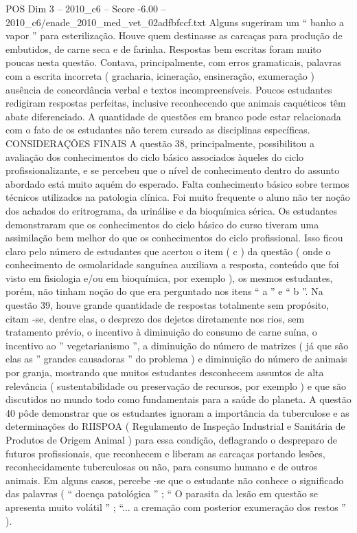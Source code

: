 \begin{textsample}{POS Dim 3 – 2010\_c6 – Score -6.00 – 2010\_c6/enade\_2010\_med\_vet\_02adfbfccf.txt}
Alguns sugeriram um “ banho a vapor ” para esterilização.
Houve quem destinasse as carcaças para produção de embutidos, de carne seca e de farinha.
Respostas bem escritas foram muito poucas nesta questão.
Contava, principalmente, com erros gramaticais, palavras com a escrita incorreta ( gracharia, icineração, ensineração, exumeração ) ausência de concordância verbal e textos incompreensíveis.
Poucos estudantes redigiram respostas perfeitas, inclusive reconhecendo que animais caquéticos têm abate diferenciado.
A quantidade de questões em branco pode estar relacionada com o fato de os estudantes não terem cursado as disciplinas específicas.
CONSIDERAÇÕES FINAIS A questão 38, principalmente, possibilitou a avaliação dos conhecimentos do ciclo básico associados àqueles do ciclo profissionalizante, e se percebeu que o nível de conhecimento dentro do assunto abordado está muito aquém do esperado.
Falta conhecimento básico sobre termos técnicos utilizados na patologia clínica.
Foi muito frequente o aluno não ter noção dos achados do eritrograma, da urinálise e da bioquímica sérica.
Os estudantes demonstraram que os conhecimentos do ciclo básico do curso tiveram uma assimilação bem melhor do que os conhecimentos do ciclo profissional.
Isso ficou claro pelo número de estudantes que acertou o item ( c ) da questão ( onde o conhecimento de osmolaridade sanguínea auxiliava a resposta, conteúdo que foi visto em fisiologia e/ou em bioquímica, por exemplo ), os mesmos estudantes, porém, não tinham noção do que era perguntado nos itens “ a ” e “ b ”.
Na questão 39, houve grande quantidade de respostas totalmente sem propósito, citam -se, dentre elas, o desprezo dos dejetos diretamente nos rios, sem tratamento prévio, o incentivo à diminuição do consumo de carne suína, o incentivo ao ” vegetarianismo ”, a diminuição do número de matrizes ( já que são elas as ” grandes causadoras ” do problema ) e diminuição do número de animais por granja, mostrando que muitos estudantes desconhecem assuntos de alta relevância ( sustentabilidade ou preservação de recursos, por exemplo ) e que são discutidos no mundo todo como fundamentais para a saúde do planeta.
A questão 40 pôde demonstrar que os estudantes ignoram a importância da tuberculose e as determinações do RIISPOA ( Regulamento de Inspeção Industrial e Sanitária de Produtos de Origem Animal ) para essa condição, deflagrando o despreparo de futuros profissionais, que reconhecem e liberam as carcaças portando lesões, reconhecidamente tuberculosas ou não, para consumo humano e de outros animais.
Em alguns casos, percebe -se que o estudante não conhece o significado das palavras ( “ doença patológica ” ; “ O parasita da lesão em questão se apresenta muito volátil ” ; “... a cremação com posterior exumeração dos restos ” ).

\end{textsample}
